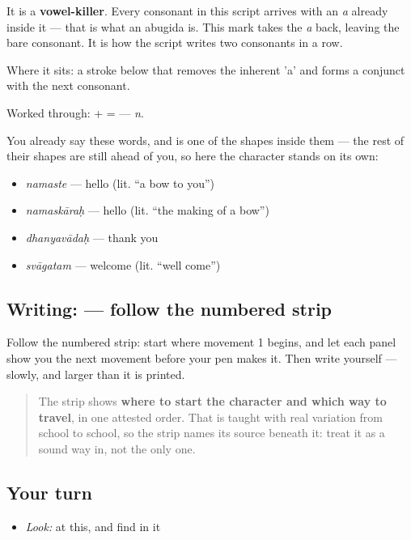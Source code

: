 It is a \textbf{vowel-killer}. Every consonant in this script arrives with an \emph{a} already inside it — that is what an abugida is. This mark takes the \emph{a} back, leaving the bare consonant. It is how the script writes two consonants in a row.

Where it sits: a stroke below that removes the inherent 'a' and forms a conjunct with the next consonant.

Worked through: \textbf{} + \textbf{} = \textbf{} — \emph{n}.

You already say these words, and  is one of the shapes inside them — the rest of their shapes are still ahead of you, so here the character stands on its own:

\begin{itemize}
\raggedright
  \item \emph{namaste} — hello (lit. \textquotedblleft{}a bow to you\textquotedblright{})
  \item \emph{namaskāraḥ} — hello (lit. \textquotedblleft{}the making of a bow\textquotedblright{})
  \item \emph{dhanyavādaḥ} — thank you
  \item \emph{svāgatam} — welcome (lit. \textquotedblleft{}well come\textquotedblright{})
\end{itemize}

\subsection*{Writing:  — follow the numbered strip}

Follow the numbered strip: start where movement 1 begins, and let each panel show you the next movement before your pen makes it. Then write  yourself — slowly, and larger than it is printed.

\begin{quote}
The strip shows \textbf{where to start the character and which way to travel}, in one attested order. That is taught with real variation from school to school, so the strip names its source beneath it: treat it as a sound way in, not the only one.
\end{quote}

\subsection*{Your turn}
\begin{itemize}
\raggedright
  \item \emph{Look:} at this, and find  in it
\end{itemize}

